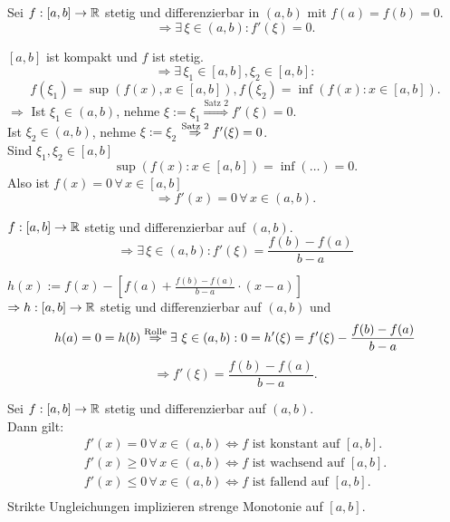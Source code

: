 \documentclass[../ana1.tex]{subfiles}
\begin{document}
\begin{satz}[Rolle]
    Sei \( f: [a,b] \rightarrow \mathbb{R} \) stetig und differenzierbar 
    in \( (a,b) \) mit \( f(a) = f(b) = 0 \).
    \[ \Rightarrow \exists \, \xi \in (a,b) : f'(\xi) = 0. \]
\end{satz}
\begin{bew}
    \( [a,b]\) ist kompakt und \(f\) ist stetig.
    \[ \Rightarrow \exists \, \xi_1 \in [a,b], \xi_2 \in [a,b]: \]
    \[ f(\xi_1) = \sup( f(x), x \in [a,b] ), f(\xi_2) 
    = \inf (f(x) : x \in [a,b]). \]
    \( \Rightarrow \) Ist \( \xi_1 \in (a,b) \), nehme 
    \( \xi := \xi_1 \overset{\text{Satz 2}}{\Rightarrow}
     f'(\xi) = 0 \).\\
    Ist \( \xi_2 \in (a,b) \), nehme \( \xi := \xi_2 \)
    \( \overset{\text{Satz 2}}{\Rightarrow} f'(\xi) = 0 \).\\
    Sind \( \xi_1, \xi_2 \in [a,b] \)
    \[ \sup(f(x) : x\in [a,b]) = \inf(\ldots) = 0. \]
    Also ist \( f(x) = 0 \,\forall \, x\in [a,b] \)
    \[ \Rightarrow f'(x) = 0 \, \forall \, x\in (a,b). \]
\end{bew}
\begin{satz}[Mittelwertsatz]\label{satz:mittelwert}
    \( f: [a, b] \rightarrow \mathbb{R} \) stetig und differenzierbar 
    auf \((a,b)\).
    \[ \Rightarrow \exists \, \xi \in (a,b): f'(\xi) = \frac{f(b)-f(a)}{b-a} \]
\end{satz}
\begin{bew}
    \( h(x) :=  f(x) - \left[f(a) + \frac{f(b)-f(a)}{b-a} 
    \cdot (x-a) \right] \) \\
    \( \Rightarrow h: [a,b] \rightarrow \mathbb{R} \) stetig und 
    differenzierbar auf \( (a,b) \) und 
    \[ h(a) = 0 = h(b) \oversett{Rolle}{\Rightarrow} 
    \exists \, \xi \in (a,b): 0 = h'(\xi) = f'(\xi) 
    - \frac{f(b)-f(a)}{b-a} \]
    \[ \Rightarrow f'(\xi) = \frac{f(b)-f(a)}{b-a}. \]
\end{bew}
\begin{kor}[Monotoniekriterium]\label{satz:monotoniekrit}
    Sei \( f : [a,b] \rightarrow \mathbb{R} \) stetig und differenzierbar 
    auf \( (a,b) \).\\
    Dann gilt:
    \begin{align*}
        f'(x) = 0 \,\forall \, x \in (a,b) \Leftrightarrow 
        f \text{ ist konstant auf } [a,b].\\
        f'(x) \geq 0 \,\forall \, x \in (a,b) \Leftrightarrow 
        f \text{ ist wachsend auf } [a,b].\\ 
        f'(x) \leq 0 \,\forall \, x \in (a,b) \Leftrightarrow 
        f \text{ ist fallend auf } [a,b].\\
    \end{align*}
    Strikte Ungleichungen implizieren strenge Monotonie auf 
    \( [a,b] \).
\end{kor}
\end{document}
